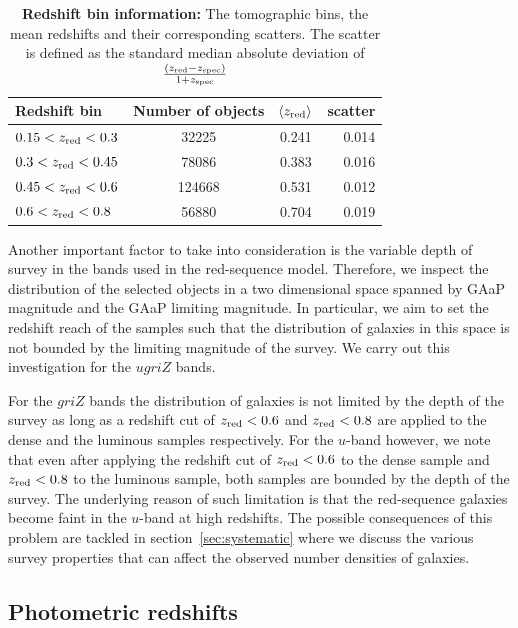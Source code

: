 \documentclass[fleqn,usenatbib,useAMS]{mnras}
\begin{document}
\begin{table}
	\centering
	\caption{{\bf Redshift bin information:} 
    The tomographic bins, the mean redshifts and their corresponding scatters. The scatter is defined as the standard median absolute deviation of $\frac{(z_{\rm red} - z_{\rm spec})}{1+z_{\rm spec}}$}
	\label{tab:pz}
	\begin{tabularx}{\columnwidth}{lccr} %
		\hline
		Redshift bin &  Number of objects & $\langle z_{\rm red} \rangle$ & scatter \\
		\hline
		$0.15 <z_{\rm red}<0.3$  & 32225  & 0.241 &  0.014  \\
		$0.3  <z_{\rm red}<0.45$ & 78086  & 0.383 &  0.016  \\
        $0.45 <z_{\rm red}<0.6$  & 124668 & 0.531&  0.012  \\
        $0.6  <z_{\rm red}<0.8$  & 56880  & 0.704 &  0.019 \\
		\hline
	\end{tabularx}
\end{table}






Another important factor to take into consideration is the variable depth of survey in the bands used in the red-sequence model. Therefore, we inspect the distribution of the selected objects in a two dimensional space spanned by GAaP magnitude and the GAaP limiting magnitude. In particular, we aim to set the redshift reach of the samples such that the distribution of galaxies in this space is not bounded by the limiting magnitude of the survey. We carry out this investigation for the $ugriZ$ bands. 

For the $griZ$ bands the distribution of galaxies is not limited by the depth of the survey as long as a redshift cut of $z_{\rm red} < 0.6$ and $z_{\rm red} < 0.8$ are applied to the dense and the luminous samples respectively. 
For the $u$-band however, we note that even after applying the redshift cut of $z_{\rm red} < 0.6$ to the dense sample and $z_{\rm red} < 0.8$ to the luminous sample, both samples are bounded by the depth of the survey. The underlying reason of such limitation is that the red-sequence galaxies become faint in the $u$-band at high redshifts. The possible consequences of this problem are tackled in section~\ref{sec:systematic} where we discuss the various survey properties that can affect the observed number densities of galaxies.

\subsection{Photometric redshifts}
\end{document}
